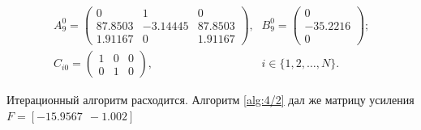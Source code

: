 \begin{equation*}
\begin{array}{lr}
A_9^0 = \left(\begin{array}{ccc}
0    &    1    &    0 \\
87.8503    &    -3.14445    &    87.8503 \\
1.91167    &    0    &    1.91167
\end{array}\right)\mbox{,} &
B_9^0 = \left(\begin{array}{c}
0 \\
-35.2216 \\
0
\end{array}\right)\mbox{;} \\

C_{i0} = \left(\begin{array}{ccc}
1 & 0 & 0 \\
0 & 1 & 0
\end{array}\right)\mbox{,} &
i \in \{1,2,\ldots,N\}.
\end{array}
\end{equation*}

Итерационный алгоритм расходится. Алгоритм \vref{alg:4/2} дал же матрицу усиления $F = [-15.9567~~-1.002]$
